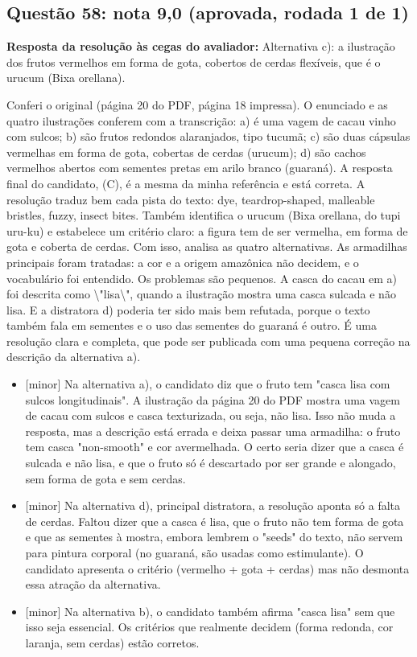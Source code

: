 \documentclass{article}%
\begin{document}
\subsection*{Questão 58: nota 9,0 (aprovada, rodada 1 de 1)}%
\textbf{Resposta da resolução às cegas do avaliador:} Alternativa c): a ilustração dos frutos vermelhos em forma de gota, cobertos de cerdas flexíveis, que é o urucum (Bixa orellana).\par %
Conferi o original (página 20 do PDF, página 18 impressa). O enunciado e as quatro ilustrações conferem com a transcrição: a) é uma vagem de cacau vinho com sulcos; b) são frutos redondos alaranjados, tipo tucumã; c) são duas cápsulas vermelhas em forma de gota, cobertas de cerdas (urucum); d) são cachos vermelhos abertos com sementes pretas em arilo branco (guaraná).\newline%
\newline%
A resposta final do candidato, (C), é a mesma da minha referência e está correta. A resolução traduz bem cada pista do texto: dye, teardrop{-}shaped, malleable bristles, fuzzy, insect bites. Também identifica o urucum (Bixa orellana, do tupi uru{-}ku) e estabelece um critério claro: a figura tem de ser vermelha, em forma de gota e coberta de cerdas. Com isso, analisa as quatro alternativas.\newline%
\newline%
As armadilhas principais foram tratadas: a cor e a origem amazônica não decidem, e o vocabulário foi entendido. Os problemas são pequenos. A casca do cacau em a) foi descrita como \textbackslash{}"lisa\textbackslash{}", quando a ilustração mostra uma casca sulcada e não lisa. E a distratora d) poderia ter sido mais bem refutada, porque o texto também fala em sementes e o uso das sementes do guaraná é outro.\newline%
\newline%
É uma resolução clara e completa, que pode ser publicada com uma pequena correção na descrição da alternativa a).%
\begin{itemize}%
\item%
{[}minor{]} Na alternativa a), o candidato diz que o fruto tem "casca lisa com sulcos longitudinais". A ilustração da página 20 do PDF mostra uma vagem de cacau com sulcos e casca texturizada, ou seja, não lisa. Isso não muda a resposta, mas a descrição está errada e deixa passar uma armadilha: o fruto tem casca "non{-}smooth" e cor avermelhada. O certo seria dizer que a casca é sulcada e não lisa, e que o fruto só é descartado por ser grande e alongado, sem forma de gota e sem cerdas.%
\item%
{[}minor{]} Na alternativa d), principal distratora, a resolução aponta só a falta de cerdas. Faltou dizer que a casca é lisa, que o fruto não tem forma de gota e que as sementes à mostra, embora lembrem o "seeds" do texto, não servem para pintura corporal (no guaraná, são usadas como estimulante). O candidato apresenta o critério (vermelho + gota + cerdas) mas não desmonta essa atração da alternativa.%
\item%
{[}minor{]} Na alternativa b), o candidato também afirma "casca lisa" sem que isso seja essencial. Os critérios que realmente decidem (forma redonda, cor laranja, sem cerdas) estão corretos.%
\end{itemize}%
\end{document}
